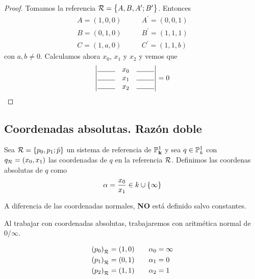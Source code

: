 \begin{proof}
Tomamos la referencia $\mathcal{R} = \left\{A,B,A^\prime;B^\prime\right\}$. Entonces
\[
\begin{aligned}
A = (1,0,0) &\qquad A^\prime = (0,0,1) \\
B = (0,1,0) &\qquad B^\prime = (1,1,1) \\
C = (1,a,0) &\qquad C^\prime = (1,1,b)
\end{aligned}
\]
con $a,b \neq 0$. Calculamos ahora $x_0$, $x_1$ y $x_
2$ y vemos que
\[
  \determinant{\line(1,0){25} & x_0 & \line(1,0){25} \\ 
    \line(1,0){25} & x_1 & \line(1,0){25} \\ \line(1,0){25} & x_2 & \line(1,0){25}} = 0
\]
\end{proof}


\subsection{Coordenadas absolutas. Razón doble}

\begin{defi}
  Sea $\mathcal{R} = \left\{p_0,p_1;\bar{p}\right\}$ un sistema de referencia de $\mathbb{P}^1_{\mathbf{k}}$ y
  sea $q \in \mathbb{P}^1_k$ con $q_{\mathcal{R}} = (x_0,x_1)$ las coordenadas de $q$ en la 
  referencia $\mathcal{R}$. Definimos las coordenas absolutas de $q$ como
  \[
    \alpha = \frac{x_0}{x_1} \in k \cup \left\{\infty\right\}
  \]
\end{defi}

\begin{obs}
  A diferencia de las coordenadas normales, \textbf{NO} está definido salvo constantes.
\end{obs}
\begin{obs}
  Al trabajar con coordenadas absolutas, trabajaremos con aritmética normal de $0/\infty$.
\end{obs}
\begin{obs}
  \[
    \begin{aligned}
      \left( p_0 \right)_{\mathcal{R}} = (1,0) &\qquad \alpha_0 = \infty \\
      \left( p_1 \right)_{\mathcal{R}} = (0,1) &\qquad \alpha_1 = 0 \\
      \left( p_2 \right)_{\mathcal{R}} = (1,1) &\qquad \alpha_2 = 1 \\
    \end{aligned}
  \]
\end{obs}

